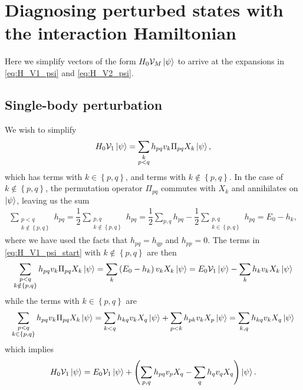 \documentclass[nofootinbib,notitlepage,11pt]{revtex4-2}
\newcommand{\f}[2]{\dfrac{#1}{#2}} %
\newcommand{\p}[1]{\left(#1\right)} %
\renewcommand{\set}[1]{\left\{#1\right\}} %
\newcommand{\1}{\mathds{1}}
\newcommand{\V}{\mathcal{V}}
\begin{document}
\newpage
\appendix

\section{Diagnosing perturbed states with the interaction Hamiltonian}

Here we simplify vectors of the form $H_0\V_M\ket\psi$ to arrive at
the expansions in \eqref{eq:H_V1_psi} and \eqref{eq:H_V2_psi}.

\subsection{Single-body perturbation}
\label{sec:H_V1_psi}

We wish to simplify
\begin{align}
  H_0 \V_1 \ket\psi
  = \sum_{\substack{k\\p<q}} h_{pq} v_k \Pi_{pq} X_k \ket\psi,
  \label{eq:H_V1_psi_start}
\end{align}
which has terms with $k\in\set{p,q}$, and terms with
$k\notin\set{p,q}$.  In the case of $k\notin\set{p,q}$, the
permutation operator $\Pi_{pq}$ commutes with $X_k$ and annihilates on
$\ket\psi$, leaving us the sum
\begin{align}
  \sum_{\substack{p<q\\k\notin\set{p,q}}} h_{pq}
  = \f12 \sum_{\substack{p,q\\k\notin\set{p,q}}} h_{pq}
  = \f12 \sum_{p,q} h_{pq}
  - \f12 \sum_{\substack{p,q\\k\in\set{p,q}}} h_{pq}
  = E_0 - h_k,
\end{align}
where we have used the facts that $h_{pq}=h_{qp}$ and $h_{pp}=0$.  The
terms in \eqref{eq:H_V1_psi_start} with $k\notin\set{p,q}$ are then
\begin{align}
  \sum_{\substack{p<q\\k\notin\set{p,q}}}
  h_{pq} v_k \Pi_{pq} X_k \ket\psi
  = \sum_k \p{E_0 - h_k} v_k X_k \ket\psi
  = E_0 \V_1 \ket\psi - \sum_k h_k v_k X_k \ket\psi
\end{align}
while the terms with $k\in\set{p,q}$ are
\begin{align}
  \sum_{\substack{p<q\\k\in\set{p,q}}}
  h_{pq} v_k \Pi_{pq} X_k \ket\psi
  = \sum_{k<q} h_{kq} v_k X_q \ket\psi
  + \sum_{p<k} h_{pk} v_k X_p \ket\psi
  = \sum_{k,q} h_{kq} v_k X_q \ket\psi
\end{align}
which implies
\begin{align}
  H_0 \V_1 \ket\psi
  = E_0 \V_1 \ket\psi
  + \p{\sum_{p,q} h_{pq} v_p X_q - \sum_q h_q v_q X_q} \ket\psi.
\end{align}
\end{document}
